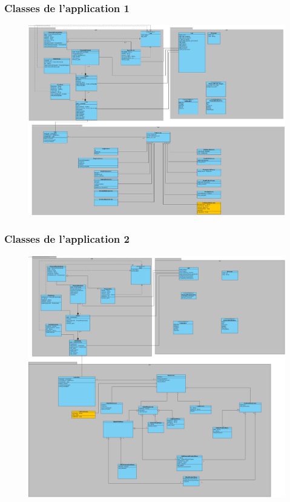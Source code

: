 \documentclass[../rapport.tex]{subfiles}
\begin{document}
\subsubsection{Classes de l'application 1}
\begin{figure}[H]
    \includegraphics[scale=0.188]{ressources/photos_diagrammes/extensionUgo/classDiagramApp1.jpg}
\end{figure}

\subsubsection{Classes de l'application 2}
\begin{figure}[H]
    \includegraphics[scale=0.188]{ressources/photos_diagrammes/extensionUgo/classDiagramApp2.jpg}
\end{figure}
\end{document}
